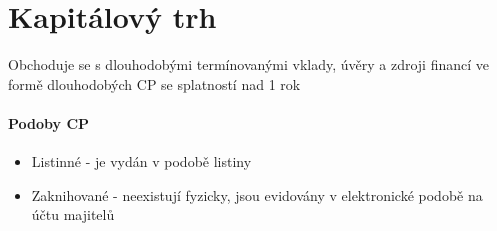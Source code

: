 \section*{Kapitálový trh}

Obchoduje se s dlouhodobými termínovanými vklady, úvěry a zdroji financí ve formě dlouhodobých CP se splatností nad 1 rok

\paragraph{Podoby CP}
\begin{itemize}
    \item Listinné - je vydán v podobě listiny
    \item Zaknihované - neexistují fyzicky, jsou evidovány v elektronické podobě na účtu majitelů
\end{itemize}

